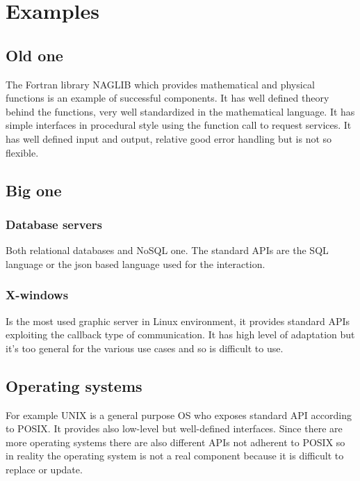 \section{Examples}
\subsection{Old one}
The Fortran library NAGLIB which provides mathematical and physical functions is an example of successful components.
It has well defined theory behind the functions, very well standardized in the mathematical language.
It has simple interfaces in procedural style using the function call to request services.
It has well defined input and output, relative good error handling but is not so flexible.

\subsection{Big one}
\subsubsection{Database servers}
Both relational databases and NoSQL one.
The standard APIs are the SQL language or the json based language used for the interaction.

\subsubsection{X-windows}
Is the most used graphic server in Linux environment, it provides standard APIs exploiting the callback type of communication.
It has high level of adaptation but it's too general for the various use cases and so is difficult to use.

\subsection{Operating systems}
For example UNIX is a general purpose OS who exposes standard API according to POSIX.
It provides also low-level but well-defined interfaces.
Since there are more operating systems there are also different APIs not adherent to POSIX so in reality the operating system is not a real component because it is difficult to replace or update.

